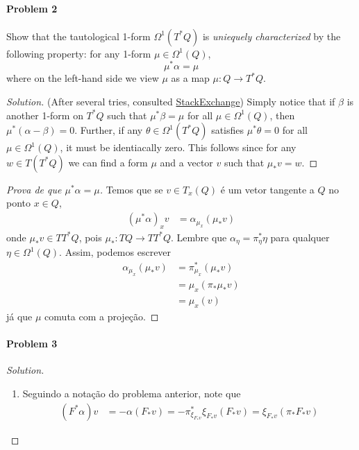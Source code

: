 \paragraph{Problem 2} Show that the tautological 1-form $\Omega^{1}(T^*Q)$ is \textit{uniequely characterized} by the following property: for any 1-form $\mu\in\Omega^{1}(Q)$,
\[\mu^*\alpha=\mu\]
where on the left-hand side we view  $\mu$ as a map $\mu:Q\to T^*Q$.

\begin{proof}[Solution]\leavevmode
	(After several tries, consulted \href{https://math.stackexchange.com/questions/4141107/a-characterization-of-the-tautological-form-liouville-1-form-on-the-cotangent}{StackExchange}) Simply notice that if $\beta$ is another 1-form on  $T^*Q$ such that $\mu^*\beta=\mu$ for all $\mu\in\Omega^{1}(Q)$, then  $\mu^*(\alpha-\beta)=0$. Further, if any  $\theta\in\Omega^{1}(T^*Q)$ satisfies $\mu^*\theta=0$ for all $\mu\in\Omega^{1}(Q)$, it must be identiacally zero. This follows since for any $w\in T(T^*Q)$ we can find a form $\mu$ and a vector $v$ such that $\mu_*v=w$.
\end{proof}


\begin{proof}[Prova de que $\mu^*\alpha=\mu$]\leavevmode
	Temos que se $v\in T_x(Q)$ \'e um vetor tangente a $Q$ no ponto $x\in Q$,
	\begin{align*}
		(\mu^*\alpha)_xv&=\alpha_{\mu_x}(\mu_*v)
	\end{align*}
	onde $\mu_*v\in T T^*Q$, pois $\mu_*:TQ\to  T T^*Q$. Lembre que $\alpha_\eta=\pi^*_{\eta}\eta$ para qualquer $\eta\in\Omega^{1}(Q)$. Assim, podemos escrever
	\begin{align*}
		\alpha_{\mu_x}(\mu_*v)&=\pi_{\mu_x}^*(\mu_{*}v)\\
		& =\mu_x(\pi_{*}\mu_*v)\\
		&=\mu_x(v)
	\end{align*}
	j\'a que $\mu$ comuta com a proje\c c\~ao.
\end{proof}

\paragraph{Problem 3} 

\begin{proof}[Solution]\leavevmode
	\begin{enumerate}[label=\alph*.]
		\item Seguindo a nota\c c\~ao do problema anterior, note que
			\begin{align*}
			(F^*\alpha)v&=-\alpha(F_*v)=-\pi^*_{\xi_{F_*v}}\xi_{F_*v}(F_*v)=\xi_{F_*v}(\pi_*F_*v)
			\end{align*}
	\end{enumerate}
\end{proof}


